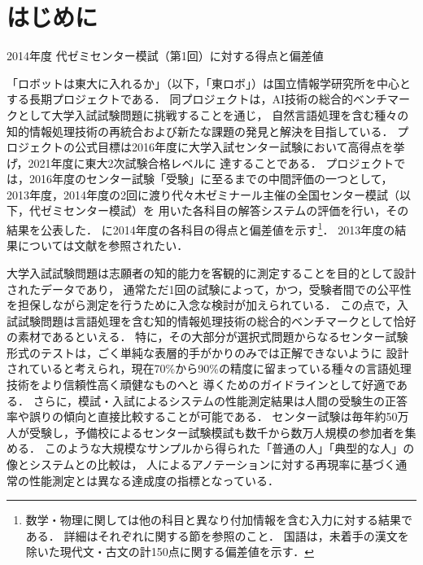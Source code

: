 \documentclass[japanese]{jnlp_1.4b}
\def\TABREF#1{}
\begin{document}
\maketitle


\section{はじめに}

\begin{table}[b]
\caption{2014年度 代ゼミセンター模試（第1回）に対する得点と偏差値}
\label{tab:intro:2014}

\end{table}

「ロボットは東大に入れるか」（以下，「東ロボ」）は国立情報学研究所を中心とする長期プロジェクトである．
同プロジェクトは，AI技術の総合的ベンチマークとして大学入試試験問題に挑戦することを通じ，
自然言語処理を含む種々の知的情報処理技術の再統合および新たな課題の発見と解決を目指している．
プロジェクトの公式目標は2016年度に大学入試センター試験において高得点を挙げ，2021年度に東大2次試験合格レベルに
達することである．
プロジェクトでは，2016年度のセンター試験「受験」に至るまでの中間評価の一つとして，
2013年度，2014年度の2回に渡り代々木ゼミナール主催の全国センター模試（以下，代ゼミセンター模試）を
用いた各科目の解答システムの評価を行い，その結果を公表した．
\TABREF{tab:intro:2014}に2014年度の各科目の得点と偏差値を示す\footnote{
    数学・物理に関しては他の科目と異なり付加情報を含む入力に対する結果である．
    詳細はそれぞれに関する節を参照のこと．
    国語は，未着手の漢文を除いた現代文・古文の計150点に関する偏差値を示す．}．
2013年度の結果については文献\cite{arai}を参照されたい．

大学入試試験問題は志願者の知的能力を客観的に測定することを目的として設計されたデータであり，
通常ただ1回の試験によって，かつ，受験者間での公平性を担保しながら測定を行うために入念な検討が加えられている．
この点で，入試試験問題は言語処理を含む知的情報処理技術の総合的ベンチマークとして恰好の素材であるといえる．
特に，その大部分が選択式問題からなるセンター試験形式のテストは，ごく単純な表層的手がかりのみでは正解できないように
設計されていると考えられ，現在70\%から90\%の精度に留まっている種々の言語処理技術をより信頼性高く頑健なものへと
導くためのガイドラインとして好適である．
さらに，模試・入試によるシステムの性能測定結果は人間の受験生の正答率や誤りの傾向と直接比較することが可能である．
センター試験は毎年約50万人が受験し，予備校によるセンター試験模試も数千から数万人規模の参加者を集める．
このような大規模なサンプルから得られた「普通の人」「典型的な人」の像とシステムとの比較は，
人によるアノテーションに対する再現率に基づく通常の性能測定とは異なる達成度の指標となっている．
\end{document}
